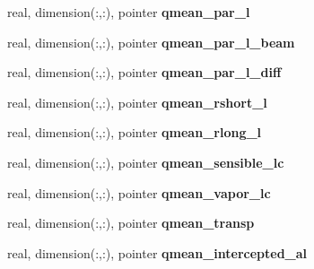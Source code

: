 \begin{DoxyCompactItemize}
\item 
\hypertarget{structed__state__vars_1_1edtype_a148cbb29f33e5260cc5cf85cdf2fe6a9}{
real, dimension(:,:), pointer {\bfseries qmean\_\-par\_\-l}}
\label{structed__state__vars_1_1edtype_a148cbb29f33e5260cc5cf85cdf2fe6a9}

\item 
\hypertarget{structed__state__vars_1_1edtype_a6ce11cdf81e6528868f9b188dbfe4b45}{
real, dimension(:,:), pointer {\bfseries qmean\_\-par\_\-l\_\-beam}}
\label{structed__state__vars_1_1edtype_a6ce11cdf81e6528868f9b188dbfe4b45}

\item 
\hypertarget{structed__state__vars_1_1edtype_a5bb7b5f0eb34ced772bb104c7001bc03}{
real, dimension(:,:), pointer {\bfseries qmean\_\-par\_\-l\_\-diff}}
\label{structed__state__vars_1_1edtype_a5bb7b5f0eb34ced772bb104c7001bc03}

\item 
\hypertarget{structed__state__vars_1_1edtype_ae1976c9e2ac1d7fa7725e8e258bd788b}{
real, dimension(:,:), pointer {\bfseries qmean\_\-rshort\_\-l}}
\label{structed__state__vars_1_1edtype_ae1976c9e2ac1d7fa7725e8e258bd788b}

\item 
\hypertarget{structed__state__vars_1_1edtype_a009eec50d251421254c2a6cbec7407cc}{
real, dimension(:,:), pointer {\bfseries qmean\_\-rlong\_\-l}}
\label{structed__state__vars_1_1edtype_a009eec50d251421254c2a6cbec7407cc}

\item 
\hypertarget{structed__state__vars_1_1edtype_a306229439ac507f9ca385eff53ded56c}{
real, dimension(:,:), pointer {\bfseries qmean\_\-sensible\_\-lc}}
\label{structed__state__vars_1_1edtype_a306229439ac507f9ca385eff53ded56c}

\item 
\hypertarget{structed__state__vars_1_1edtype_aadeecc6e38a40eb81c1506d4bc337dfc}{
real, dimension(:,:), pointer {\bfseries qmean\_\-vapor\_\-lc}}
\label{structed__state__vars_1_1edtype_aadeecc6e38a40eb81c1506d4bc337dfc}

\item 
\hypertarget{structed__state__vars_1_1edtype_a02db97637a05f7685d51c1b2c278d451}{
real, dimension(:,:), pointer {\bfseries qmean\_\-transp}}
\label{structed__state__vars_1_1edtype_a02db97637a05f7685d51c1b2c278d451}

\item 
\hypertarget{structed__state__vars_1_1edtype_a673a821cb03c974416e66291b3793db0}{
real, dimension(:,:), pointer {\bfseries qmean\_\-intercepted\_\-al}}
\label{structed__state__vars_1_1edtype_a673a821cb03c974416e66291b3793db0}


\end{DoxyCompactItemize}
